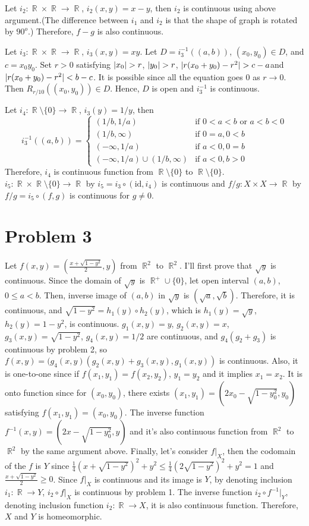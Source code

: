 \documentclass{article}
\DeclareMathOperator{\rr}{\mathbb{R}}
\DeclarePairedDelimiter\abs{\lvert}{\rvert}%
\begin{document}
Let $i_2:\rr\times\rr \rightarrow\rr $, $i_2(x,y)=x-y$, then $i_2$ is continuous using above argument.(The difference between $i_1$ and $i_2$ is that the shape of graph is rotated by $90^o$.) Therefore, $f-g$ is also continuous.

Let $i_3:\rr\times\rr \rightarrow\rr $, $i_3(x,y)=xy$. Let $D=i_3^{-1}\left((a,b)\right)$, $(x_0,y_0)\in D$, and $c=x_0y_0$. Set $r>0$ satisfying $\abs{x_0}>r$, $\abs{y_0}>r$, $\abs{r(x_0+y_0)-r^2}>c-a$and $\abs{r(x_0+y_0)-r^2}<b-c$. It is possible since all the equation goes $0$ as $r\rightarrow 0$. Then $R_{r/10}\left((x_0,y_0)\right)\in D$. Hence, $D$ is open and $i_3^{-1}$ is continuous.

Let $i_4:\rr\setminus\{0\} \rightarrow\rr $, $i_3(y)=1/y$, then
\begin{equation*}
i_3^{-1}((a,b))=
\begin{cases}
(1/b,1/a) & \text{if }0<a<b \text{ or }a<b<0\\
(1/b, \infty) & \text{if } 0=a,0<b \\
(-\infty, 1/a) & \text{if } a<0,0=b \\
(-\infty, 1/a)\cup (1/b,\infty) & \text{if } a<0, b>0
\end{cases}
\end{equation*}
Therefore, $i_4$ is continuous function from $\rr\setminus\{0\}$ to $\rr\setminus\{0\}$. $i_5:\rr\times \rr\setminus\{0\}\rightarrow \rr$ by $i_5=i_3 \circ (\text{id},i_4)$ is continuous and $f/g:X\times X\rightarrow \rr$ by $f/g=i_5 \circ (f,g)$ is continuous for $g\neq 0$.
\section*{Problem 3}
Let $f(x,y)=(\frac{x+\sqrt{1-y^2}}{2}, y)$ from $\rr^2$ to $\rr^2$. I'll first prove that $\sqrt{y}$ is continuous. Since the domain of $\sqrt{y}$ is $\rr^+\cup \{0\}$, let open interval $(a, b)$, $0\leq a<b$. Then, inverse image of $(a,b)$ in $\sqrt{y}$ is $(\sqrt{a}, \sqrt{b})$. Therefore, it is continuous, and $\sqrt{1-y^2}=h_1(y)\circ h_2(y)$, which is $h_1(y)=\sqrt{y}$, $h_2(y)=1-y^2$, is continuous. $g_1(x,y)=y$, $g_2(x,y)=x$, $g_3(x,y)=\sqrt{1-y^2}$, $g_4(x,y)=1/2$ are continuous, and $g_4(g_2+g_3)$ is continuous by problem 2, so $f(x,y)=(g_4(x,y)(g_2(x,y)+g_3(x,y),g_1(x,y))$ is continuous. Also, it is one-to-one since if $f(x_1, y_1)=f(x_2,y_2)$, $y_1=y_2$ and it implies $x_1=x_2$. It is onto function since for $(x_0, y_0)$, there exists $(x_1,y_1)=(2x_0-\sqrt{1-y_0^2},y_0)$ satisfying $f(x_1,y_1)=(x_0,y_0)$. The inverse function $f^{-1}(x,y)=(2x-\sqrt{1-y_0^2}, y)$ and it's also continuous function from $\rr^2$ to $\rr^2$ by the same argument above. Finally, let's consider $f|_X$, then the codomain of the $f$ is $Y$ since $\frac{1}{4}(x+\sqrt{1-y^2})^2+y^2 \leq \frac{1}{4}(2\sqrt{1-y^2})^2+y^2=1$ and $\frac{x+\sqrt{1-y^2}}{2}\geq 0$. Since $f|_X$ is continuous and its image is $Y$, by denoting inclusion $i_1:\rr\rightarrow Y$, $i_2\circ f|_X$ is continuous by problem 1. The inverse function $i_2\circ f^{-1}|_Y$, denoting inclusion function $i_2:\rr\rightarrow X$, it is also continuous function. Therefore, $X$ and $Y$ is homeomorphic.
\end{document}

